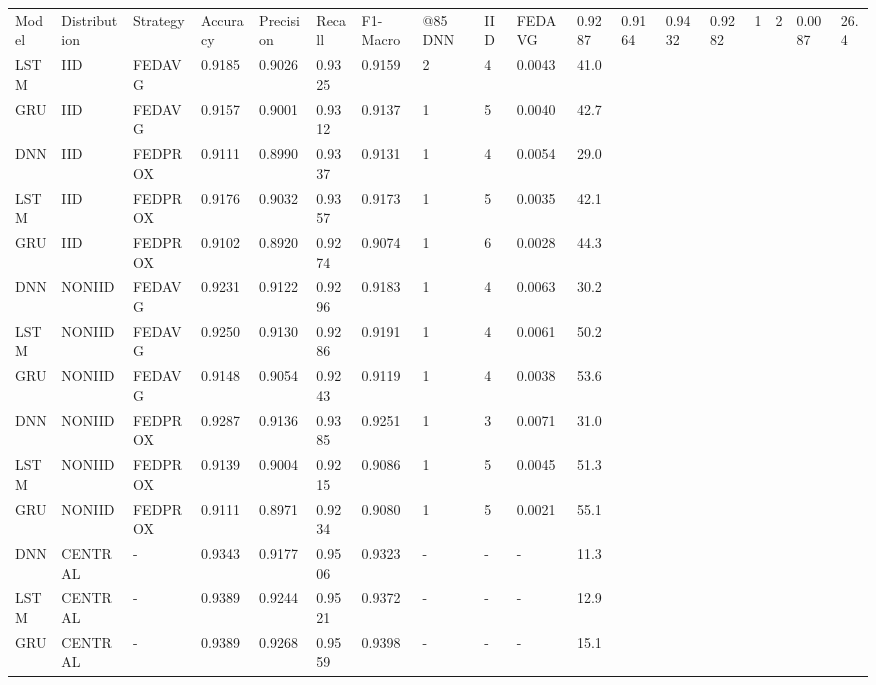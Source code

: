 \begin{tabular}{lllllllllll}
\toprule
Model & Distribution & Strategy & Accuracy & Precision & Recall & F1-Macro & @85%
\midrule
DNN & IID & FEDAVG & 0.9287 & 0.9164 & 0.9432 & 0.9282 & 1 & 2 & 0.0087 & 26.4 \\
LSTM & IID & FEDAVG & 0.9185 & 0.9026 & 0.9325 & 0.9159 & 2 & 4 & 0.0043 & 41.0 \\
GRU & IID & FEDAVG & 0.9157 & 0.9001 & 0.9312 & 0.9137 & 1 & 5 & 0.0040 & 42.7 \\
DNN & IID & FEDPROX & 0.9111 & 0.8990 & 0.9337 & 0.9131 & 1 & 4 & 0.0054 & 29.0 \\
LSTM & IID & FEDPROX & 0.9176 & 0.9032 & 0.9357 & 0.9173 & 1 & 5 & 0.0035 & 42.1 \\
GRU & IID & FEDPROX & 0.9102 & 0.8920 & 0.9274 & 0.9074 & 1 & 6 & 0.0028 & 44.3 \\
DNN & NONIID & FEDAVG & 0.9231 & 0.9122 & 0.9296 & 0.9183 & 1 & 4 & 0.0063 & 30.2 \\
LSTM & NONIID & FEDAVG & 0.9250 & 0.9130 & 0.9286 & 0.9191 & 1 & 4 & 0.0061 & 50.2 \\
GRU & NONIID & FEDAVG & 0.9148 & 0.9054 & 0.9243 & 0.9119 & 1 & 4 & 0.0038 & 53.6 \\
DNN & NONIID & FEDPROX & 0.9287 & 0.9136 & 0.9385 & 0.9251 & 1 & 3 & 0.0071 & 31.0 \\
LSTM & NONIID & FEDPROX & 0.9139 & 0.9004 & 0.9215 & 0.9086 & 1 & 5 & 0.0045 & 51.3 \\
GRU & NONIID & FEDPROX & 0.9111 & 0.8971 & 0.9234 & 0.9080 & 1 & 5 & 0.0021 & 55.1 \\
DNN & CENTRAL & - & 0.9343 & 0.9177 & 0.9506 & 0.9323 & - & - & - & 11.3 \\
LSTM & CENTRAL & - & 0.9389 & 0.9244 & 0.9521 & 0.9372 & - & - & - & 12.9 \\
GRU & CENTRAL & - & 0.9389 & 0.9268 & 0.9559 & 0.9398 & - & - & - & 15.1 \\
\bottomrule
\end{tabular}
